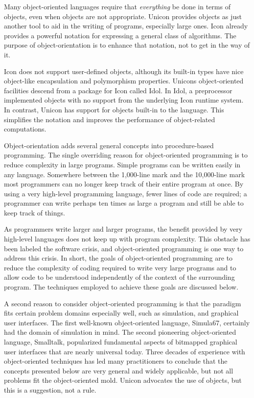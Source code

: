 Many object-oriented languages require that \textit{everything} be done
in terms of objects, even when objects are not appropriate. Unicon
provides objects as just another tool to aid in the writing of
programs, especially large ones. Icon already provides a powerful
notation for expressing a general class of algorithms. The purpose of
object-orientation is to enhance that notation, not to get in the way
of it.

Icon does not support user-defined objects, although its built-in types
have nice object-like encapsulation and polymorphism properties.
Unicon{\textquotesingle}s object-oriented facilities descend from a
package for Icon called Idol. In Idol, a preprocessor
implemented objects with no support from the underlying Icon runtime
system. In contrast, Unicon has support for objects built-in to the
language. This simplifies the notation and improves the performance of
object-related computations.

Object-orientation adds several general concepts into procedure-based
programming. The single overriding reason for object-oriented programming is to reduce complexity in
large programs. Simple programs can be written easily in any language.
Somewhere between the 1,000-line mark and the 10,000-line mark most
programmers can no longer keep track of their entire program at once.
By using a very high-level programming language, fewer lines of code
are required; a programmer can write perhaps ten times as large a
program and still be able to keep track of things.

As programmers write larger and larger programs, the benefit provided by
very high-level languages does not keep
up with program complexity. This obstacle has been labeled the
{\textquotedbl}software crisis,{\textquotedbl} and object-oriented
programming is one way to address this crisis. In short, the goals of
object-oriented programming are to reduce the complexity of coding
required to write very large programs and to allow code to be
understood independently of the context of the surrounding program. The
techniques employed to achieve these goals are discussed below. 

A second reason to consider object-oriented programming is that the
paradigm fits certain problem domains especially well, such as
simulation, and graphical user interfaces. The first well-known
object-oriented language, Simula67, certainly had the
domain of simulation in mind. The second pioneering object-oriented
language, Smalltalk, popularized fundamental aspects of bitmapped
graphical user interfaces that are nearly universal today. Three
decades of experience with object-oriented techniques has led many
practitioners to conclude that the concepts presented below are very
general and widely applicable, but not all problems fit the
object-oriented mold. Unicon advocates the use of objects, but this is
a suggestion, not a rule. 

